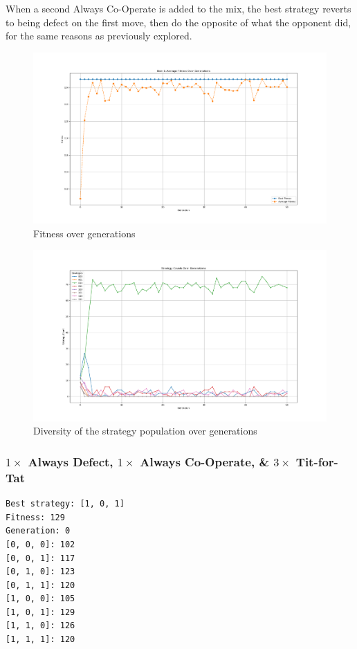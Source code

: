 \documentclass[a4paper]{article}
\newenvironment{code}{\captionsetup{type=listing}}{}
\begin{document}
When a second Always Co-Operate is added to the mix, the best strategy reverts to being defect on the first move, then do the opposite of what the opponent did, for the same reasons as previously explored.

\begin{figure}[H]
    \centering
    \includegraphics[width=\textwidth]{./images/cop_fitness.png}
    \caption{Fitness over generations}
\end{figure}

\begin{figure}[H]
    \centering
    \includegraphics[width=\textwidth]{./images/cop_strats.png}
    \caption{Diversity of the strategy population over generations}
\end{figure}

\subsubsection{$1 \times $ Always Defect, $1 \times$ Always Co-Operate, \& $3 \times$ Tit-for-Tat}
\begin{code}
\begin{verbatim}
Best strategy: [1, 0, 1]
Fitness: 129
Generation: 0
[0, 0, 0]: 102
[0, 0, 1]: 117
[0, 1, 0]: 123
[0, 1, 1]: 120
[1, 0, 0]: 105
[1, 0, 1]: 129
[1, 1, 0]: 126
[1, 1, 1]: 120
\end{verbatim}
\caption{ $1 \times $ always defect, $1 \times$ always co-operate, \& $3 \times$ tit-for-tat} \end{code}
\end{code}
\end{document}

